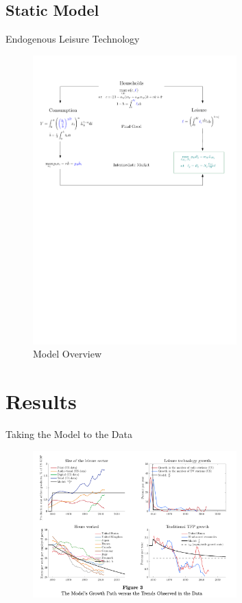 \documentclass[usenames,dvipsnames,aspectratio=169]{beamer}
\begin{document}
\subsection{Static Model}


\begin{frame}{Endogenous Leisure Technology}
    \begin{figure}
        \centering
        \includegraphics[width = 0.7\textwidth]{Presentation01/Figures/Mod2.pdf}
        \caption{Model Overview}
    \end{figure}
\end{frame}

\section{Results}

\begin{frame}{Taking the Model to the Data}
\begin{figure}
    \centering    
    \includegraphics[width=0.7\textwidth]{Presentation01/Figures/ModTrends.png}
\end{figure}  
\end{frame}
\end{document}

